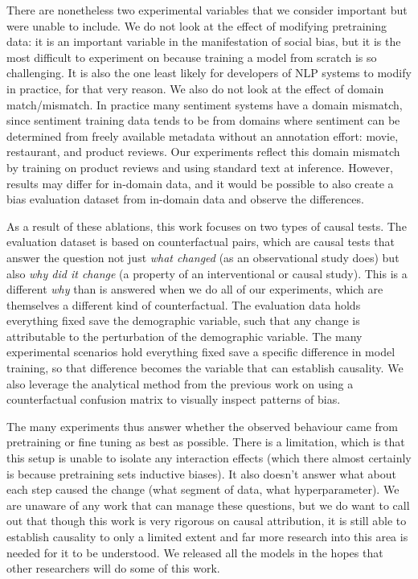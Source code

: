There are nonetheless two experimental variables that we consider important but were unable to include. We do not look at the effect of modifying pretraining data: it is an important variable in the manifestation of social bias, but it is the most difficult to experiment on because training a model from scratch is so challenging. It is also the one least likely for developers of NLP systems to modify in practice, for that very reason. We also do not look at the effect of domain match/mismatch. In practice many sentiment systems have a domain mismatch, since sentiment training data tends to be from domains where sentiment can be determined from freely available metadata without an annotation effort: movie, restaurant, and product reviews. Our experiments reflect this domain mismatch by training on product reviews and using standard text at inference. However, results may differ for in-domain data, and it would be possible to also create a bias evaluation dataset from in-domain data and observe the differences.

As a result of these ablations, this work focuses on two types of causal tests. The evaluation dataset is based on counterfactual pairs, which are causal tests that answer the question not just \textit{what changed} (as an observational study does) but also \textit{why did it change} (a property of an interventional or causal study). This is a different \textit{why} than is answered when we do all of our experiments, which are themselves a different kind of counterfactual. The evaluation data holds everything fixed save the demographic variable, such that any change is attributable to the perturbation of the demographic variable. The many experimental scenarios hold everything fixed save a specific difference in model training, so that difference becomes the variable that can establish causality.
We also leverage the analytical method from the previous work on using a counterfactual confusion matrix to visually inspect patterns of bias. 

The many experiments thus answer whether the observed behaviour came from pretraining or fine tuning as best as possible. There is a limitation, which is that this setup is unable to isolate any interaction effects (which there almost certainly is because pretraining sets inductive biases). It also doesn't answer what about each step caused the change (what segment of data, what hyperparameter). We are unaware of any work that can manage these questions, but we do want to call out that though this work is very rigorous on causal attribution, it is still able to establish causality to only a limited extent and far more research into this area is needed for it to be understood. We released all the models in the hopes that other researchers will do some of this work. 

